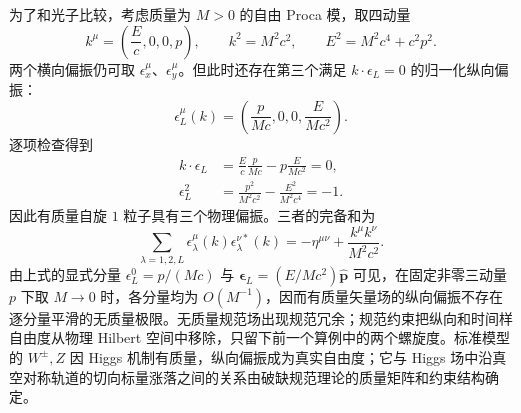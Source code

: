 \begin{exbox}[有质量矢量场为什么多一个纵向偏振]
为了和光子比较，考虑质量为 $M>0$ 的自由 Proca 模，取四动量
\begin{equation*}
 k^\mu=\left(\frac Ec,0,0,p\right),
 \qquad
 k^2=M^2c^2,
 \qquad
 E^2=M^2c^4+c^2p^2.
\end{equation*}
两个横向偏振仍可取 $\epsilon_x^\mu$、$\epsilon_y^\mu$。但此时还存在第三个满足 $k\cdot\epsilon_L=0$ 的归一化纵向偏振：
\begin{equation}
 \boxed{
 \epsilon_L^\mu(k)
 =\left(\frac{p}{Mc},0,0,\frac{E}{Mc^2}\right).}
 \label{eq:massive-vector-longitudinal-polarization-dp62}
\end{equation}
逐项检查得到
\begin{align*}
 k\cdot\epsilon_L
 &=\frac Ec\frac{p}{Mc}-p\frac{E}{Mc^2}=0,\\
 \epsilon_L^2
 &=\frac{p^2}{M^2c^2}-\frac{E^2}{M^2c^4}=-1.
\end{align*}
因此有质量自旋 $1$ 粒子具有三个物理偏振。三者的完备和为
\begin{equation}
 \boxed{
 \sum_{\lambda=1,2,L}
 \epsilon_\lambda^\mu(k)\epsilon_\lambda^{\nu *}(k)
 =-\eta^{\mu\nu}+\frac{k^\mu k^\nu}{M^2c^2}.}
 \label{eq:massive-vector-polarization-sum-dp62}
\end{equation}
由上式的显式分量 $\epsilon_L^0=p/(Mc)$ 与 $\boldsymbol\epsilon_L=(E/Mc^2)\hat{\mathbf p}$ 可见，在固定非零三动量 $p$ 下取 $M\to0$ 时，各分量均为 $O(M^{-1})$，因而有质量矢量场的纵向偏振不存在逐分量平滑的无质量极限。无质量规范场出现规范冗余；规范约束把纵向和时间样自由度从物理 Hilbert 空间中移除，只留下前一个算例中的两个螺旋度。标准模型的 $W^\pm,Z$ 因 Higgs 机制有质量，纵向偏振成为真实自由度；它与 Higgs 场中沿真空对称轨道的切向标量涨落之间的关系由破缺规范理论的质量矩阵和约束结构确定。
\end{exbox}
